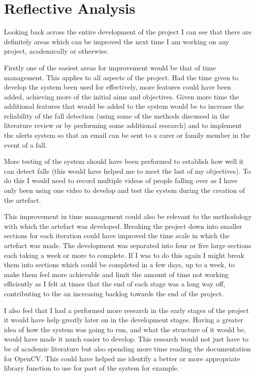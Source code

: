 \documentclass[11pt,a4paper]{report}
\begin{document}
\chapter{Reflective Analysis}
Looking back across the entire development of the project I can see that there are definitely areas which can be improved the next time I am working on any project, academically or otherwise.

Firstly one of the easiest areas for improvement would be that of time management. This applies to all aspects of the project. Had the time given to develop the system been used for effectively, more features could have been added, achieving more of the initial aims and objectives. Given more time the additional features that would be added to the system would be to increase the reliability of the fall detection (using some of the methods discussed in the literature review or by performing some additional research) and to implement the alerts system so that an email can be sent to a carer or family member in the event of a fall. 

More testing of the system should have been performed to establish how well it can detect falls (this would have helped me to meet the last of my objectives). To do this I would need to record multiple videos of people falling over as I have only been using one video to develop and test the system during the creation of the artefact.

This improvement in time management could also be relevant to the methodology with which the artefact was developed. Breaking the project down into smaller sections for each iteration could have improved the time scale in which the artefact was made. The development was separated into four or five large sections each taking a week or more to complete. If I was to do this again I might break them into sections which could be completed in a few days, up to a week, to make them feel more achievable and limit the amount of time not working efficiently as I felt at times that the end of each stage was a long way off, contributing to the an increasing backlog towards the end of the project.

I also feel that I had a performed more research in the early stages of the project it would have help greatly later on in the development stages. Having a greater idea of how the system was going to run, and what the structure of it would be, would have made it much easier to develop. This research would not just have to be of academic literature but also spending more time reading the documentation for OpenCV. This could have helped me identify a better or more appropriate library function to use for part of the system for example.
\end{document}
